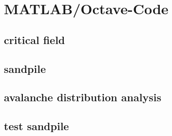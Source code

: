 




\startnewchapter

\chapter{MATLAB/Octave-Code}\label{chp:matlab}
\thispagestyle{fancy}

\section{critical field}

\vspace{2em}

\section{sandpile}

\vspace{2em}

\section{avalanche distribution analysis}

\vspace{2em}

\section{test sandpile}

\clearpage

%

%



